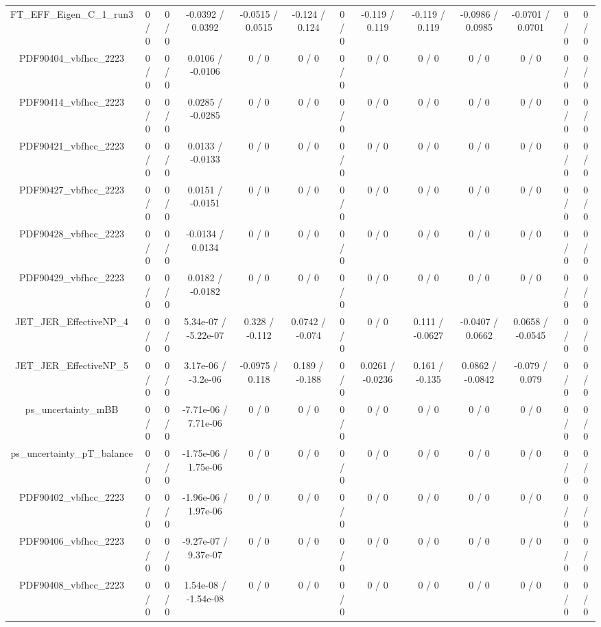 \documentclass[10pt]{article}
\begin{document}
\begin{table}[htbp]
\begin{center}
\begin{tabular}{|c|c|c|c|c|c|c|c|c|c|c|c|c|}
  FT_EFF_Eigen_C_1_run3 & 0 / 0 & 0 / 0 & -0.0392 / 0.0392 & -0.0515 / 0.0515 & -0.124 / 0.124 & 0 / 0 & -0.119 / 0.119 & -0.119 / 0.119 & -0.0986 / 0.0985 & -0.0701 / 0.0701 & 0 / 0 & 0 / 0 \\ 
  PDF90404_vbfhcc_2223 & 0 / 0 & 0 / 0 & 0.0106 / -0.0106 & 0 / 0 & 0 / 0 & 0 / 0 & 0 / 0 & 0 / 0 & 0 / 0 & 0 / 0 & 0 / 0 & 0 / 0 \\ 
  PDF90414_vbfhcc_2223 & 0 / 0 & 0 / 0 & 0.0285 / -0.0285 & 0 / 0 & 0 / 0 & 0 / 0 & 0 / 0 & 0 / 0 & 0 / 0 & 0 / 0 & 0 / 0 & 0 / 0 \\ 
  PDF90421_vbfhcc_2223 & 0 / 0 & 0 / 0 & 0.0133 / -0.0133 & 0 / 0 & 0 / 0 & 0 / 0 & 0 / 0 & 0 / 0 & 0 / 0 & 0 / 0 & 0 / 0 & 0 / 0 \\ 
  PDF90427_vbfhcc_2223 & 0 / 0 & 0 / 0 & 0.0151 / -0.0151 & 0 / 0 & 0 / 0 & 0 / 0 & 0 / 0 & 0 / 0 & 0 / 0 & 0 / 0 & 0 / 0 & 0 / 0 \\ 
  PDF90428_vbfhcc_2223 & 0 / 0 & 0 / 0 & -0.0134 / 0.0134 & 0 / 0 & 0 / 0 & 0 / 0 & 0 / 0 & 0 / 0 & 0 / 0 & 0 / 0 & 0 / 0 & 0 / 0 \\ 
  PDF90429_vbfhcc_2223 & 0 / 0 & 0 / 0 & 0.0182 / -0.0182 & 0 / 0 & 0 / 0 & 0 / 0 & 0 / 0 & 0 / 0 & 0 / 0 & 0 / 0 & 0 / 0 & 0 / 0 \\ 
  JET_JER_EffectiveNP_4 & 0 / 0 & 0 / 0 & 5.34e-07 / -5.22e-07 & 0.328 / -0.112 & 0.0742 / -0.074 & 0 / 0 & 0 / 0 & 0.111 / -0.0627 & -0.0407 / 0.0662 & 0.0658 / -0.0545 & 0 / 0 & 0 / 0 \\ 
  JET_JER_EffectiveNP_5 & 0 / 0 & 0 / 0 & 3.17e-06 / -3.2e-06 & -0.0975 / 0.118 & 0.189 / -0.188 & 0 / 0 & 0.0261 / -0.0236 & 0.161 / -0.135 & 0.0862 / -0.0842 & -0.079 / 0.079 & 0 / 0 & 0 / 0 \\ 
  ps_uncertainty_mBB & 0 / 0 & 0 / 0 & -7.71e-06 / 7.71e-06 & 0 / 0 & 0 / 0 & 0 / 0 & 0 / 0 & 0 / 0 & 0 / 0 & 0 / 0 & 0 / 0 & 0 / 0 \\ 
  ps_uncertainty_pT_balance & 0 / 0 & 0 / 0 & -1.75e-06 / 1.75e-06 & 0 / 0 & 0 / 0 & 0 / 0 & 0 / 0 & 0 / 0 & 0 / 0 & 0 / 0 & 0 / 0 & 0 / 0 \\ 
  PDF90402_vbfhcc_2223 & 0 / 0 & 0 / 0 & -1.96e-06 / 1.97e-06 & 0 / 0 & 0 / 0 & 0 / 0 & 0 / 0 & 0 / 0 & 0 / 0 & 0 / 0 & 0 / 0 & 0 / 0 \\ 
  PDF90406_vbfhcc_2223 & 0 / 0 & 0 / 0 & -9.27e-07 / 9.37e-07 & 0 / 0 & 0 / 0 & 0 / 0 & 0 / 0 & 0 / 0 & 0 / 0 & 0 / 0 & 0 / 0 & 0 / 0 \\ 
  PDF90408_vbfhcc_2223 & 0 / 0 & 0 / 0 & 1.54e-08 / -1.54e-08 & 0 / 0 & 0 / 0 & 0 / 0 & 0 / 0 & 0 / 0 & 0 / 0 & 0 / 0 & 0 / 0 & 0 / 0 \\ 

\end{tabular}
\end{center}
\end{table}
\end{document}
